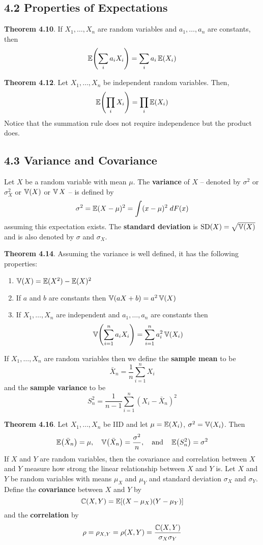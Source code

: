 \subsection*{4.2 Properties of
Expectations}\label{properties-of-expectations}

\textbf{Theorem 4.10}. If \(X_{1}, \dots, X_{n}\) are random variables and
\(a_{1}, \dots, a_{n}\) are constants, then
\[
\EXP\left( \sum_{i} a_{i} X_{i} \right) = \sum_{i} a_{i} \EXP(X_{i})
\]

\textbf{Theorem 4.12}. Let \(X_{1}, \dots, X_{n}\) be independent random
variables. Then,
\[
\EXP\left(\prod_{i} X_{i} \right) = \prod_{i} \EXP(X_{i})
\]
Notice that the summation rule does not require independence but the
product does.

\subsection*{4.3 Variance and
Covariance}\label{variance:covariance}
Let \(X\) be a random variable with mean \(\mu\). The \textbf{variance}
of \(X\) -- denoted by \(\sigma^{2}\) or \(\sigma_X^{2}\) or
\(\operatorname{\mathbb{V}}(X)\) or \(\operatorname{\mathbb{V}} X\) -- is defined by
\[
\sigma^{2} = \operatorname{\mathbb{E}}(X - \mu)^{2} = \int (x - \mu)^{2}\; dF(x)
\]
assuming this expectation exists. The \textbf{standard deviation} is
\(\operatorname{\mathrm{SD}}(X) = \sqrt{\operatorname{\mathbb{V}}(X)}\) and is also denoted by
\(\sigma\) and \(\sigma_X\).

\textbf{Theorem 4.14}. Assuming the variance is well defined, it has the
following properties:
\begin{enumerate}[label={\arabic*.}]
\item
  \(\operatorname{\mathbb{V}}(X) = \operatorname{\mathbb{E}}(X^{2}) - \operatorname{\mathbb{E}}(X)^{2}\)
\item
  If \(a\) and \(b\) are constants then
  \(\operatorname{\mathbb{V}}(aX + b) = a^{2} \operatorname{\mathbb{V}}(X)\)
\item
  If \(X_{1}, \dots, X_{n}\) are independent and \(a_{1}, \dots, a_{n}\) are
  constants then
  \[
\VAR\left( \sum_{i=1}^{n} a_{i}X_{i} \right) = \sum_{i=1}^{n} a_{i}^{2} \VAR(X_{i})
\]
\end{enumerate}
If \(X_{1}, \dots, X_{n}\) are random variables then we define the
\textbf{sample mean} to be
\[
\bar{X}_{n} = \frac{1}{n} \sum_{i=1}^{n} X_{i} 
\]
and the \textbf{sample variance} to be
\[
S_{n}^{2} = \frac{1}{n - 1} \sum_{i=1}^{n} \left(X_{i} - \bar{X}_{n}\right)^{2}
\]

\textbf{Theorem 4.16}. Let \(X_{1}, \dots, X_{n}\) be IID and let
\(\mu = \operatorname{\mathbb{E}}(X_{i})\), \(\sigma^{2} = \operatorname{\mathbb{V}}(X_{i})\). Then
\[
\EXP\left(\bar{X}_{n}\right) = \mu,
\quad
\VAR\left(\bar{X}_{n}\right) = \frac{\sigma^{2}}{n},
\quad \text{and} \quad
\EXP\left(S_{n}^{2}\right) = \sigma^{2}
\]
If \(X\) and \(Y\) are random variables, then the covariance and
correlation between \(X\) and \(Y\) measure how strong the linear
relationship between \(X\) and \(Y\) is.
Let \(X\) and \(Y\) be random variables with means \(\mu_X\) and
\(\mu_Y\) and standard deviation \(\sigma_X\) and \(\sigma_Y\). Define
the \textbf{covariance} between \(X\) and \(Y\) by
\[
\operatorname{\mathbb{C}}(X, Y) = \operatorname{\mathbb{E}}[(X - \mu_X)(Y - \mu_Y)]
\]
and the \textbf{correlation} by
\[
\rho = \rho_{X, Y} = \rho(X, Y) = \frac{\operatorname{\mathbb{C}}(X, Y)}{\sigma_X \sigma_Y}
\]

